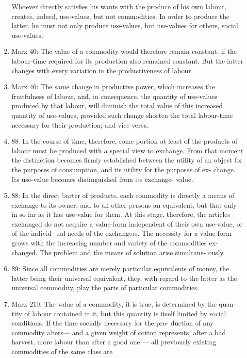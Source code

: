 \documentclass[12pt]{article}
\begin{document}
\begin{enumerate}
Whoever directly satisfies his wants with the produce of his own
labour, creates, indeed, use-values, but not commodities. 
In order to produce the latter, he must not only produce use-values, but
use-values for others, social use-values. 
    \item Marx 40: The value of a commodity would therefore remain constant,
if the labour-time required for its production also remained
constant. But the latter changes with every variation in the
productiveness of labour. 
    \item Marx 46: The same change in productive power, which
	increases the fruitfulness of labour, and, in consequence, the
	quantity of use-values produced by that labour, will diminish
	the total value of this increased quantity of use-values, provided
	such change shorten the total labour-time necessary for their
	production; and vice versa.
	\item 88: In the course of time, therefore, some
portion at least of the products of labour must be produced with
a special view to exchange. From that moment the distinction
becomes firmly established between the utility of an object for
the purposes of consumption, and its utility for the purposes of ex-
change. Its use-value becomes distinguished from its exchange-
value. 
	\item 88: In the direct barter of products, each commodity is directly
a means of exchange to its owner, and to all other persons an
equivalent, but that only in so far as it has use-value for them.
At this stage, therefore, the articles exchanged do not acquire
a value-form independent of their own use-value, or of the individ-
ual needs of the exchangers. The necessity for a value-form grows
with the increasing number and variety of the commodities ex-
changed. The problem and the means of solution arise simultane-
ously. 
	\item 89: Since all commodities are merely particular equivalents of
money, the latter being their universal equivalent, they, with
regard to the latter as the universal commodity, play the parts
of particular commodities. 
    \item Marx 210: The value of a commodity, it is true, is determined by the quan-
tity of labour contained in it, but this quantity is itself limited
by social conditions. If the time socially necessary for the pro-
duction of any commodity alters— and a given weight of cotton
represents, after a bad harvest, more labour than after a good
one — all previously existing commodities of the same class are

\end{enumerate}
\end{document}
